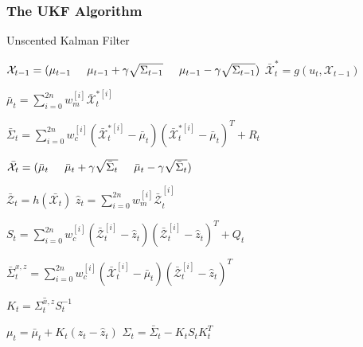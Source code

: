 \subsubsection{The UKF Algorithm}

\begin{algorithm}[H]
\caption{Unscented Kalman Filter}

\BlankLine
$\mathcal{X}_{t-1} = (\mu_{t-1} \hspace{5mm} \mu_{t-1} + \gamma \sqrt{\Sigma_{t-1}} \hspace{5mm} \mu_{t-1}-\gamma \sqrt{\Sigma_{t-1}})$\;
$\bar{\mathcal{X}}_t^* = g(u_t, \mathcal{X}_{t-1})$\;

\BlankLine

$\bar{\mu}_t = \sum_{i=0}^{2n}{w_m^{ [i] } \bar{\mathcal{X}}^{ *[i] }_t}$\;

\BlankLine

$\bar{\Sigma}_t = \sum_{i=0}^{2n}{w_c^{ [i] }(\bar{\mathcal{X}}_t^{ *[i] } - \bar{\mu}_t)(\bar{\mathcal{X}}_t^{ *[i] } - \bar{\mu}_t)^T} + R_t$\;

\BlankLine

$\bar{\mathcal{X}}_{t} = (\bar{\mu}_{t} \hspace{5mm} \bar{\mu}_{t} + \gamma \sqrt{\bar{\Sigma}_{t}} \hspace{5mm} \bar{\mu}_{t}-\gamma \sqrt{\bar{\Sigma}_{t}})$\;

\BlankLine

$\bar{\mathcal{Z}}_t = h(\bar{\mathcal{X}_t})$\;
$\hat{z}_t = \sum_{i=0}^{2n} {w_m^{ [i] } \bar{\mathcal{Z}}}_t^{ [i] } $\;

\BlankLine

$S_t = \sum_{i=0}^{2n}{w_c^{ [i] }(\bar{\mathcal{Z}}_t^{ [i] } - \hat{z}_t)(\bar{\mathcal{Z}}_t^{ [i] } - \hat{z}_t)^T} + Q_t$\;

$\bar{\Sigma}_t^{x,z} = \sum_{i=0}^{2n}{w_c^{ [i] }(\bar{\mathcal{X}}_t^{ [i] } - \bar{\mu}_t)(\bar{\mathcal{Z}}_t^{ [i] } - \hat{z}_t)^T}$\;

\BlankLine

$K_t = \bar{\Sigma_t^{x,z}} S_t^{-1}$\;

\BlankLine

$\mu_t = \bar{\mu}_t + K_t (z_t - \hat{z}_t)$\;
$\Sigma_t = \bar{\Sigma}_t - K_t S_t K_t^T$\;

\BlankLine
{}
\end{algorithm}

